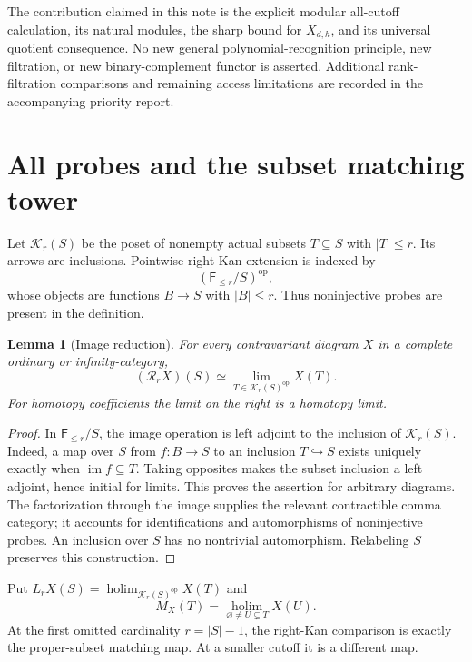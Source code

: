 \documentclass[11pt,a4paper]{article}
\newtheorem{lemma}[theorem]{Lemma}
\theoremstyle{definition}
\theoremstyle{remark}
\newcommand{\F}{\mathsf F}
\newcommand{\Rr}{\mathcal R_r}
\newcommand{\Kpos}{\mathcal K_r(S)}
\newcommand{\op}{\mathrm{op}}
\newcommand{\im}{\operatorname{im}}
\newcommand{\holim}{\operatorname*{holim}}
\newcommand{\limm}{\operatorname*{lim}}
\begin{document}
The contribution claimed in this note is the explicit modular all-cutoff calculation, its natural modules, the sharp bound for $X_{d,h}$, and its universal quotient consequence. No new general polynomial-recognition principle, new filtration, or new binary-complement functor is asserted. Additional rank-filtration comparisons and remaining access limitations are recorded in the accompanying priority report.

\section{All probes and the subset matching tower}

Let $\Kpos$ be the poset of nonempty actual subsets $T\subseteq S$ with $|T|\le r$. Its arrows are inclusions. Pointwise right Kan extension is indexed by
\[
 (\F_{\le r}/S)^{\op},
\]
whose objects are functions $B\to S$ with $|B|\le r$. Thus noninjective probes are present in the definition.

\begin{lemma}[Image reduction]\label{lem:image}
For every contravariant diagram $X$ in a complete ordinary or infinity-category,
\[
 (\Rr X)(S)\simeq\limm_{T\in\Kpos^{\op}}X(T).
\]
For homotopy coefficients the limit on the right is a homotopy limit.
\end{lemma}
\begin{proof}
In $\F_{\le r}/S$, the image operation is left adjoint to the inclusion of $\Kpos$. Indeed, a map over $S$ from $f:B\to S$ to an inclusion $T\hookrightarrow S$ exists uniquely exactly when $\im f\subseteq T$. Taking opposites makes the subset inclusion a left adjoint, hence initial for limits. This proves the assertion for arbitrary diagrams. The factorization through the image supplies the relevant contractible comma category; it accounts for identifications and automorphisms of noninjective probes. An inclusion over $S$ has no nontrivial automorphism. Relabeling $S$ preserves this construction.
\end{proof}

Put $L_rX(S)=\holim_{\Kpos^{\op}}X(T)$ and
\[
 M_X(T)=\holim_{\varnothing\ne U\subsetneq T}X(U).
\]
At the first omitted cardinality $r=|S|-1$, the right-Kan comparison is exactly the proper-subset matching map. At a smaller cutoff it is a different map.
\end{document}
